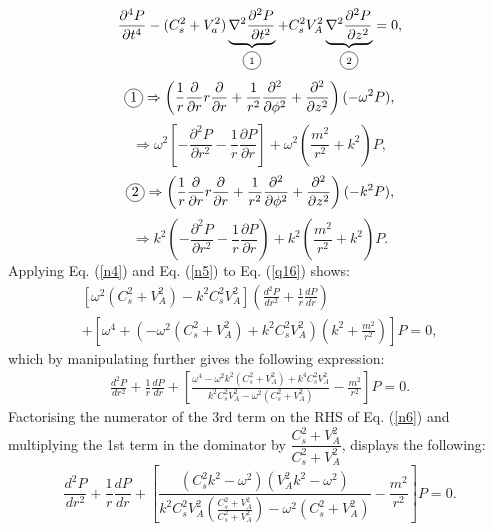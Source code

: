 \documentclass[12pt,a4paper,twoside]{article}
\newcommand\encircle[1]{%
  \tikz[baseline=(X.base)] 
    \node (X) [draw, shape=circle, inner sep=0] {\strut #1};}
\begin{document}
\begin{equation}
\frac{\partial^4 P}{\partial t^4} -(C^2_s + V^2_a )\underbrace{ \nabla^2 \frac{\partial^2 P}{\partial t^2}}_\text{\encircle{1}} +C^2_s V^2_A \underbrace{ \nabla ^2 \frac{\partial^2 P}{\partial z^2}}_\text{\encircle{2}}=0 ,
\end{equation}
\begin{equation}
\encircle{1} \Rightarrow \left( \frac{1}{r} \frac{\partial}{\partial r} r \frac{\partial}{\partial r} + \frac{1}{r^2} \frac{\partial^2}{\partial \phi^2} + \frac{\partial^2}{\partial z^2} \right)(-\omega^2 P) ,
\end{equation}
\begin{equation}\label{n4}
\Rightarrow \omega^2 \left[- \frac{\partial^2 P}{\partial r^2} - \frac{1}{r} \frac{\partial P}{\partial r} \right] + \omega^2 \left( \frac{m^2}{r^2}  + k^2  \right) P ,
\end{equation}
\begin{equation}
\encircle{2} \Rightarrow \left( \frac{1}{r} \frac{\partial}{\partial r} r \frac{\partial}{\partial r} + \frac{1}{r^2} \frac{\partial^2}{\partial \phi^2} + \frac{\partial^2}{\partial z^2} \right)(-k^2 P) ,
\end{equation}
\begin{equation}\label{n5}
\Rightarrow k^2 \left( - \frac{\partial^2 P}{\partial r^2} - \frac{1}{r} \frac{\partial P}{\partial r} \right) + k^2 \left( \frac{m^2}{r^2}  + k^2  \right) P .
\end{equation}
Applying Eq. (\ref{n4}) and  Eq. (\ref{n5}) to Eq. (\ref{q16}) shows: 
\begin{align}
\left[ \omega^2 (C^2_s + V^2_A) - k^2C^2_sV^2_A   \right] \left( \frac{d^2P}{dr^2} + \frac{1}{r} \frac{dP}{dr}  \right) \\ + \left[ \omega^4 + (- \omega^2 (C^2_s+ V^2_A)+k^2 C^2_s V^2_A ) \left( k^2 + \frac{m^2}{r^2} \right)   \right] P =0 ,
\end{align}
which by manipulating further gives the following expression: 
\begin{align}\label{n6}
 \frac{d^2P}{dr^2} + \frac{1}{r} \frac{dP}{dr}  + \left[  \frac{\omega^4 - \omega^2 k^2 (C^2_s+ V^2_A)+k^4 C^2_s V^2_A }{ k^2C^2_sV^2_A - \omega^2 (C^2_s + V^2_A)} - \frac{m^2}{r^2}  \right] P =0 .
\end{align}
Factorising the numerator of the 3rd term on the RHS of Eq. (\ref{n6}) and multiplying the 1st term in the dominator by $\dfrac{C_s^2+V^2_A}{C_s^2+V^2_A}$, displays the following:
\begin{equation}\label{n7}
 \frac{d^2P}{dr^2} + \frac{1}{r} \frac{dP}{dr}  + \left[  \frac{ (C^2_sk^2-\omega^2)(V^2_Ak^2-\omega^2) }{  k^2C^2_sV^2_A \left( \frac{C_s^2+V^2_A}{C_s^2+V^2_A}  \right) -\omega^2 (C^2_s + V^2_A)  } - \frac{m^2}{r^2}  \right] P =0 .
\end{equation}
\end{document}

